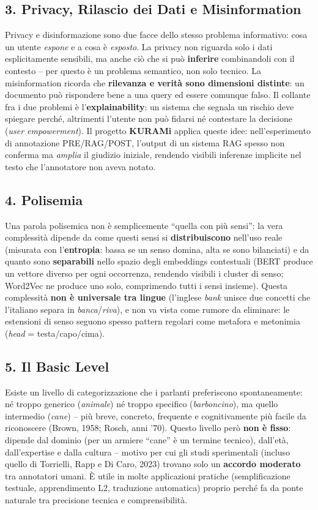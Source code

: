 \documentclass[11pt,a4paper]{article}
\begin{document}
\subsection*{3. Privacy, Rilascio dei Dati e Misinformation}
Privacy e disinformazione sono due facce dello stesso problema informativo: cosa un utente \emph{espone} e a cosa \`e \emph{esposto}. La privacy non riguarda solo i dati esplicitamente sensibili, ma anche ci\`o che si pu\`o \textbf{inferire} combinandoli con il contesto -- per questo \`e un problema semantico, non solo tecnico. La misinformation ricorda che \textbf{rilevanza e verit\`a sono dimensioni distinte}: un documento pu\`o rispondere bene a una query ed essere comunque falso. Il collante fra i due problemi \`e l'\textbf{explainability}: un sistema che segnala un rischio deve spiegare perch\'e, altrimenti l'utente non pu\`o fidarsi n\'e contestare la decisione (\emph{user empowerment}). Il progetto \textbf{KURAMi} applica queste idee: nell'esperimento di annotazione PRE/RAG/POST, l'output di un sistema RAG spesso non conferma ma \emph{amplia} il giudizio iniziale, rendendo visibili inferenze implicite nel testo che l'annotatore non aveva notato.

\subsection*{4. Polisemia}
Una parola polisemica non \`e semplicemente ``quella con pi\`u sensi'': la vera complessit\`a dipende da come questi sensi si \textbf{distribuiscono} nell'uso reale (misurata con l'\textbf{entropia}: bassa se un senso domina, alta se sono bilanciati) e da quanto sono \textbf{separabili} nello spazio degli embeddings contestuali (BERT produce un vettore diverso per ogni occorrenza, rendendo visibili i cluster di senso; Word2Vec ne produce uno solo, comprimendo tutti i sensi insieme). Questa complessit\`a \textbf{non \`e universale tra lingue} (l'inglese \emph{bank} unisce due concetti che l'italiano separa in \emph{banca}/\emph{riva}), e non va vista come rumore da eliminare: le estensioni di senso seguono spesso pattern regolari come metafora e metonimia (\emph{head} = testa/capo/cima).

\subsection*{5. Il Basic Level}
Esiste un livello di categorizzazione che i parlanti preferiscono spontaneamente: n\'e troppo generico (\emph{animale}) n\'e troppo specifico (\emph{barboncino}), ma quello intermedio (\emph{cane}) -- pi\`u breve, concreto, frequente e cognitivamente pi\`u facile da riconoscere (Brown, 1958; Rosch, anni '70). Questo livello per\`o \textbf{non \`e fisso}: dipende dal dominio (per un armiere ``cane'' \`e un termine tecnico), dall'et\`a, dall'expertise e dalla cultura -- motivo per cui gli studi sperimentali (incluso quello di Torrielli, Rapp e Di Caro, 2023) trovano solo un \textbf{accordo moderato} tra annotatori umani. \`E utile in molte applicazioni pratiche (semplificazione testuale, apprendimento L2, traduzione automatica) proprio perch\'e fa da ponte naturale tra precisione tecnica e comprensibilit\`a.
\end{document}
